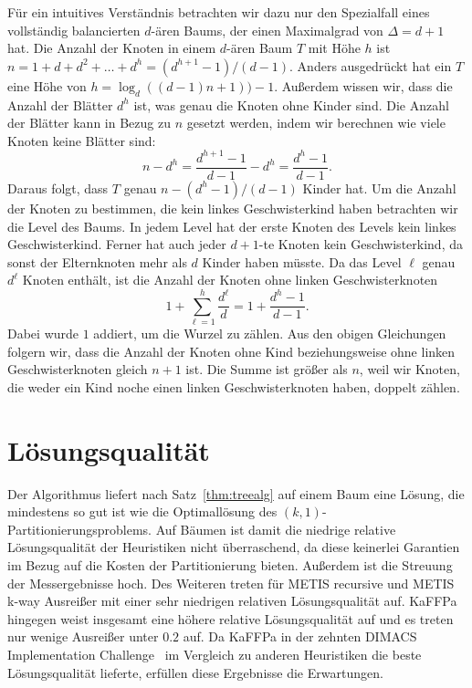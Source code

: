 Für ein intuitives Verständnis betrachten wir dazu nur den Spezialfall eines vollständig balancierten $d$\hyp ären Baums, der einen Maximalgrad von $\Delta = d + 1$ hat.
Die Anzahl der Knoten in einem $d$\hyp ären Baum $T$ mit Höhe $h$ ist $n = 1 + d + d^2 + \ldots + d^h = (d^{h+1} - 1)/(d - 1)$.
Anders ausgedrückt hat ein $T$ eine Höhe von $h = \log_d((d-1)n+1))-1$.
Außerdem wissen wir, dass die Anzahl der Blätter $d^h$ ist, was genau die Knoten ohne Kinder sind.
Die Anzahl der Blätter kann in Bezug zu $n$ gesetzt werden, indem wir berechnen wie viele Knoten keine Blätter sind:
\begin{equation*}
    n - d^h = \frac{d^{h+1} - 1}{d - 1}  - d^h = \frac{d^h - 1}{d - 1}.
\end{equation*}
Daraus folgt, dass $T$ genau $n - (d^h - 1)/(d - 1)$ Kinder hat.
Um die Anzahl der Knoten zu bestimmen, die kein linkes Geschwisterkind haben betrachten wir die Level des Baums.
In jedem Level hat der erste Knoten des Levels kein linkes Geschwisterkind.
Ferner hat auch jeder $d+1$\hyp te Knoten kein Geschwisterkind, da sonst der Elternknoten mehr als $d$ Kinder haben müsste.
Da das Level $\ell$ genau $d^{\ell}$ Knoten enthält, ist die Anzahl der Knoten ohne linken Geschwisterknoten
\begin{equation*}
    1 + \sum_{\ell=1}^{h} \frac{d^\ell}{d} = 1 + \frac{d^h - 1}{d - 1}.
\end{equation*}
Dabei wurde $1$ addiert, um die Wurzel zu zählen.
Aus den obigen Gleichungen folgern wir, dass die Anzahl der Knoten ohne Kind beziehungsweise ohne linken Geschwisterknoten gleich $n + 1$ ist.
Die Summe ist größer als $n$, weil wir Knoten, die weder ein Kind noche einen linken Geschwisterknoten haben, doppelt zählen.


\section{Lösungsqualität}
Der Algorithmus liefert nach Satz~\ref{thm:treealg} auf einem Baum eine Lösung, die mindestens so gut ist wie die Optimallösung des $(k, 1)$\hyp Partitionierungsproblems.
Auf Bäumen ist damit die niedrige relative Lösungsqualität der Heuristiken nicht überraschend, da diese keinerlei Garantien im Bezug auf die Kosten der Partitionierung bieten.
Außerdem ist die Streuung der Messergebnisse hoch. 
Des Weiteren treten für METIS recursive und METIS k-way Ausreißer mit einer sehr niedrigen relativen Lösungsqualität auf.
KaFFPa hingegen weist insgesamt eine höhere relative Lösungsqualität auf und es treten nur wenige Ausreißer unter $0.2$ auf.
Da KaFFPa in der zehnten DIMACS Implementation Challenge~\cite{BMS+13} im Vergleich zu anderen Heuristiken die beste Lösungsqualität lieferte, erfüllen diese Ergebnisse die Erwartungen.

